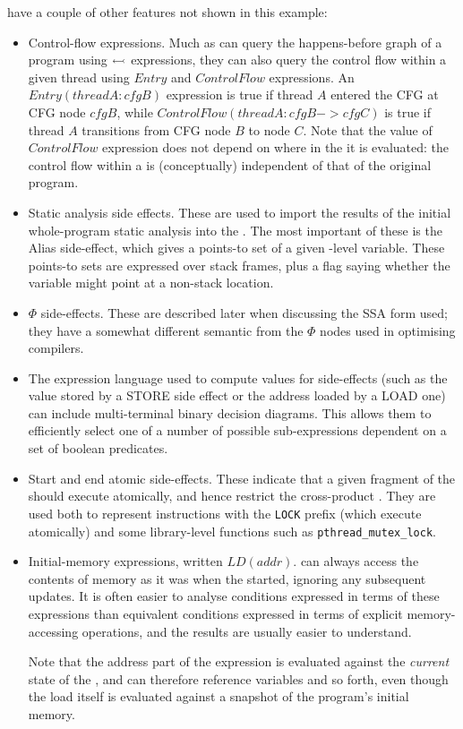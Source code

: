 \STateMachines have a couple of other features not shown in this
example:

\begin{itemize}
\item
  Control-flow expressions.  Much as \StateMachines can query the
  happens-before graph of a program using $\leftarrowtail$
  expressions, they can also query the control flow within a given
  thread using $Entry$ and $ControlFlow$ expressions.  An
  $Entry(threadA:cfgB)$ expression is true if thread $A$ entered the
  CFG at CFG node $cfgB$, while $ControlFlow(threadA:cfgB->cfgC)$ is
  true if thread $A$ transitions from CFG node $B$ to node $C$.  Note
  that the value of $ControlFlow$ expression does not depend on where
  in the \StateMachine it is evaluated: the control flow within a
  \StateMachine is (conceptually) independent of that of the original
  program.
\item
  Static analysis side effects.  These are used to import the results
  of the initial whole-program static analysis into the \StateMachine.
  The most important of these is the Alias side-effect, which gives a
  points-to set of a given \StateMachine-level variable.  These
  points-to sets are expressed over stack frames, plus a flag saying
  whether the variable might point at a non-stack location.
\item
  $\Phi$ side-effects.  These are described later when discussing the
  SSA form used; they have a somewhat different semantic from the
  $\Phi$ nodes used in optimising compilers.
\item
  The expression language used to compute values for side-effects
  (such as the value stored by a STORE side effect or the address
  loaded by a LOAD one) can include multi-terminal binary decision
  diagrams.  This allows
  them to efficiently select one of a number of possible
  sub-expressions dependent on a set of boolean predicates.
\item
  Start and end atomic side-effects.  These indicate that a given
  fragment of the \StateMachine should execute atomically, and hence
  restrict the cross-product \StateMachine.  They are used both to
  represent instructions with the \verb|LOCK| prefix (which execute
  atomically) and some library-level functions such as
  \verb|pthread_mutex_lock|.
\item
  Initial-memory expressions, written $LD(addr)$.  {\STateMachines}
  can always access the contents of memory as it was when the
  {\StateMachine} started, ignoring any subsequent updates.  It is
  often easier to analyse conditions expressed in terms of these
  expressions than equivalent conditions expressed in terms of
  explicit memory-accessing operations, and the results are usually
  easier to understand.

  Note that the address part of the expression is evaluated against
  the \emph{current} state of the {\StateMachine}, and can therefore
  reference {\StateMachine} variables and so forth, even though the
  load itself is evaluated against a snapshot of the program's initial
  memory.
\end{itemize}

